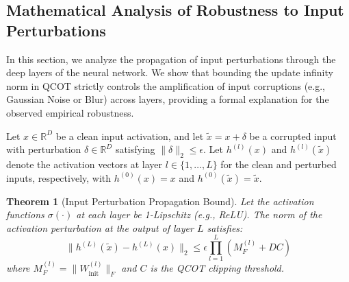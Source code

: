 \documentclass{article}
\theoremstyle{plain}
\newtheorem{theorem}{Theorem}[section]
\theoremstyle{definition}
\theoremstyle{remark}
\begin{document}
\subsection{Mathematical Analysis of Robustness to Input Perturbations}
\label{sec:proof_perturbation}

In this section, we analyze the propagation of input perturbations through the deep layers of the neural network. We show that bounding the update infinity norm in QCOT strictly controls the amplification of input corruptions (e.g., Gaussian Noise or Blur) across layers, providing a formal explanation for the observed empirical robustness.

Let $x \in \mathbb{R}^D$ be a clean input activation, and let $\tilde{x} = x + \delta$ be a corrupted input with perturbation $\delta \in \mathbb{R}^D$ satisfying $\|\delta\|_2 \le \epsilon$. Let $h^{(l)}(x)$ and $h^{(l)}(\tilde{x})$ denote the activation vectors at layer $l \in \{1, \dots, L\}$ for the clean and perturbed inputs, respectively, with $h^{(0)}(x) = x$ and $h^{(0)}(\tilde{x}) = \tilde{x}$.

\begin{theorem}[Input Perturbation Propagation Bound]
Let the activation functions $\sigma(\cdot)$ at each layer be 1-Lipschitz (e.g., ReLU). The norm of the activation perturbation at the output of layer $L$ satisfies:
\begin{equation}
    \|h^{(L)}(\tilde{x}) - h^{(L)}(x)\|_2 \le \epsilon \prod_{l=1}^L \left( M_F^{(l)} + D C \right)
\end{equation}
where $M_F^{(l)} = \|W_{\text{init}}^{(l)}\|_F$ and $C$ is the QCOT clipping threshold.
\label{thm:perturbation_bound}
\end{theorem}
\end{document}
